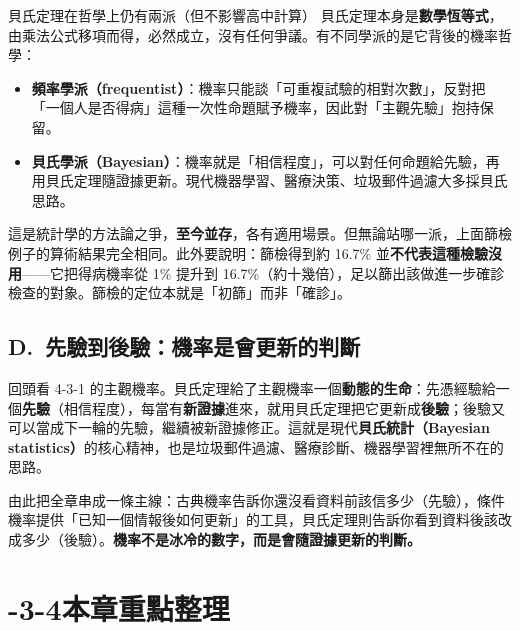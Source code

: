 \documentclass[11pt]{article}
\begin{document}
\begin{延伸框}{貝氏定理在哲學上仍有兩派（但不影響高中計算）}
貝氏定理本身是\textbf{數學恆等式}，由乘法公式移項而得，必然成立，沒有任何爭議。有不同學派的是它背後的機率哲學：

\begin{itemize}\setlength{\itemsep}{1pt}
\item \textbf{頻率學派（frequentist）}：機率只能談「可重複試驗的相對次數」，反對把「一個人是否得病」這種一次性命題賦予機率，因此對「主觀先驗」抱持保留。
\item \textbf{貝氏學派（Bayesian）}：機率就是「相信程度」，可以對任何命題給先驗，再用貝氏定理隨證據更新。現代機器學習、醫療決策、垃圾郵件過濾大多採貝氏思路。
\end{itemize}

這是統計學的方法論之爭，\textbf{至今並存}，各有適用場景。但無論站哪一派，上面篩檢例子的算術結果完全相同。此外要說明：篩檢得到約 16.7\% 並\textbf{不代表這種檢驗沒用}——它把得病機率從 1\% 提升到 16.7\%（約十幾倍），足以篩出該做進一步確診檢查的對象。篩檢的定位本就是「初篩」而非「確診」。
\end{延伸框}

\subsection*{\sffamily D.\ 先驗到後驗：機率是會更新的判斷}

回頭看 4-3-1 的主觀機率。貝氏定理給了主觀機率一個\textbf{動態的生命}：先憑經驗給一個\textbf{先驗}（相信程度），每當有\textbf{新證據}進來，就用貝氏定理把它更新成\textbf{後驗}；後驗又可以當成下一輪的先驗，繼續被新證據修正。這就是現代\textbf{貝氏統計（Bayesian statistics）}的核心精神，也是垃圾郵件過濾、醫療診斷、機器學習裡無所不在的思路。

由此把全章串成一條主線：古典機率告訴你還沒看資料前該信多少（先驗），條件機率提供「已知一個情報後如何更新」的工具，貝氏定理則告訴你看到資料後該改成多少（後驗）。\textbf{機率不是冰冷的數字，而是會隨證據更新的判斷。}

\section*{-3-4\quad 本章重點整理}
\end{document}
